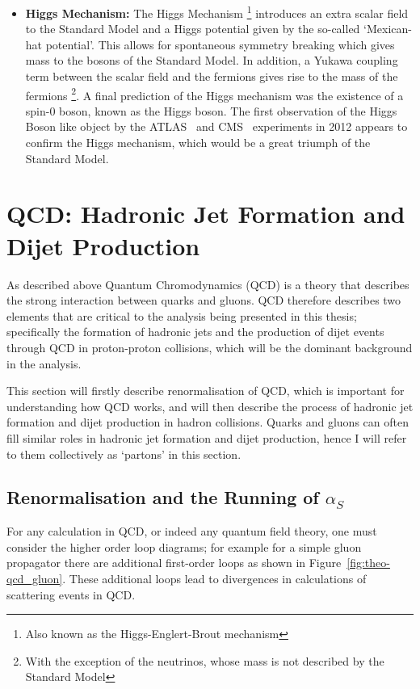 \begin{itemize}[leftmargin=*]
\item\textbf{Higgs Mechanism:}
  The Higgs Mechanism \footnote{Also known as the Higgs-Englert-Brout mechanism}
  introduces an extra scalar field to the Standard Model
  and a Higgs potential given by the so-called `Mexican-hat potential'.
  This allows for spontaneous symmetry breaking which gives mass to the bosons of the Standard Model.
  In addition, a Yukawa coupling term between the scalar field and the fermions gives rise to the mass of the fermions
  \footnote{With the exception of the neutrinos, whose mass is not described by the Standard Model}.
  A final prediction of the Higgs mechanism was the existence of a spin-0 boson, known as the Higgs boson.
  The first observation of the Higgs Boson like object by the ATLAS~\cite{theo-higgs_atlas} and CMS~\cite{theo-higgs_cms} experiments
  in 2012 appears to confirm the Higgs mechanism, which would be a great triumph of the Standard Model.
\end{itemize}

\section{QCD: Hadronic Jet Formation and Dijet Production}
\label{theo-qcd}

As described above Quantum Chromodynamics (QCD) is a theory that describes the strong interaction between
quarks and gluons.
QCD therefore describes two elements that are critical to the analysis being presented in this thesis;
specifically the formation of hadronic jets and the production of dijet events through QCD in proton-proton collisions,
which will be the dominant background in the analysis.

This section will firstly describe renormalisation of QCD, which is important for understanding how QCD works,
and will then describe the process of hadronic jet formation and dijet production in hadron collisions.
Quarks and gluons can often fill similar roles in hadronic jet formation and dijet production, hence I will refer to them collectively as `partons' in this section.

\subsection{Renormalisation and the Running of $\alpha_S$}
\label{sec:theo-qcd_dijet_running}

For any calculation in QCD, or indeed any quantum field theory, one must consider the higher order loop diagrams;
for example for a simple gluon propagator there are additional first-order loops as shown in Figure~\ref{fig:theo-qcd_gluon}.
These additional loops lead to divergences in calculations of scattering events in QCD.

